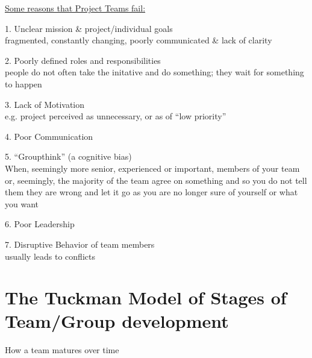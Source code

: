 \documentclass[]{project_plan}
\begin{document}
\underline{Some reasons that Project Teams fail:}

1. Unclear mission \& project/individual goals\\
fragmented, constantly changing, poorly communicated \& lack of clarity

2. Poorly defined roles and responsibilities\\
people do not often take the initative and do something; they wait for something to happen

3. Lack of Motivation\\
e.g. project perceived as unnecessary, or as of “low priority”

4. Poor Communication

5. “Groupthink” (a cognitive bias)\\
When, seemingly more senior, experienced or important, members
of your team or, seemingly, the majority of the team agree on something and so
you do not tell them they are wrong and let it go as you are no longer
sure of yourself or what you want

6. Poor Leadership

7. Disruptive Behavior of team members\\
usually leads to conflicts

\newpage

\section{The Tuckman Model of Stages of Team/Group development}

How a team matures over time
\end{document}
